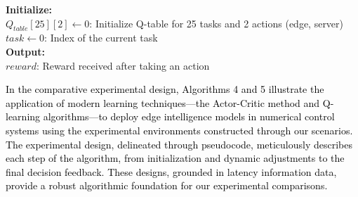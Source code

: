\documentclass[preprint,12pt]{elsarticle}
\begin{document}
\begin{algorithm}[H]
    \caption{Q-Learning Task Offloading}
    \label{alg:5}
    \textbf{Initialize:}\\
        $Q_{table}[25][2] \leftarrow 0$: Initialize Q-table for 25 tasks and 2 actions (edge, server) \\
        $task \leftarrow 0$: Index of the current task \\
    \textbf{Output:}\\
        $reward$: Reward received after taking an action \\
    
\end{algorithm}
    
\textcolor{black}{In the comparative experimental design, Algorithms 4 and 5 illustrate the application of modern learning techniques—the Actor-Critic method and Q-learning algorithms—to deploy edge intelligence models in numerical control systems using the experimental environments constructed through our scenarios. The experimental design, delineated through pseudocode, meticulously describes each step of the algorithm, from initialization and dynamic adjustments to the final decision feedback. These designs, grounded in latency information data, provide a robust algorithmic foundation for our experimental comparisons.}
\end{document}
